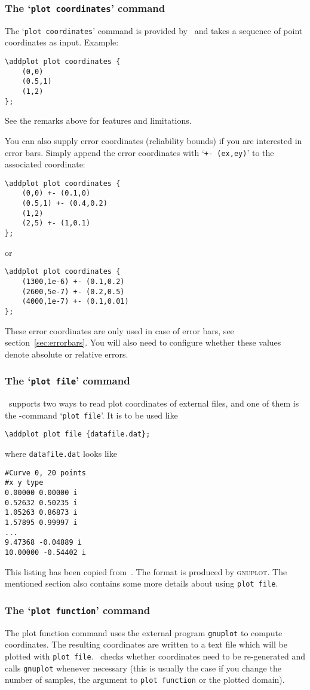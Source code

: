 \subsubsection{The `\texttt{plot coordinates}' command}
The `\texttt{plot coordinates}' command is provided by \Tikz\ and takes a sequence of point coordinates as input. Example:
\begin{lstlisting}
\addplot plot coordinates {
	(0,0)
	(0.5,1)
	(1,2)
};
\end{lstlisting}
See the remarks above for features and limitations.

You can also supply error coordinates (reliability bounds) if you are interested in error bars. Simply append the error coordinates with `\texttt{+- (ex,ey)}' to the associated coordinate:
\begin{lstlisting}
\addplot plot coordinates {
	(0,0) +- (0.1,0)
	(0.5,1) +- (0.4,0.2)
	(1,2)
	(2,5) +- (1,0.1)
};
\end{lstlisting}
or 
\begin{lstlisting}
\addplot plot coordinates {
	(1300,1e-6) +- (0.1,0.2)
	(2600,5e-7) +- (0.2,0.5)
	(4000,1e-7) +- (0.1,0.01)
};
\end{lstlisting}
These error coordinates are only used in case of error bars, see section~\ref{sec:errorbars}. You will also need to configure whether these values denote absolute or relative errors.


\subsubsection{The `\texttt{plot file}' command}
\PGFPlots\ supports two ways to read plot coordinates of external files, and one of them is the \Tikz-command `\texttt{plot file}'. It is to be used like
\begin{lstlisting}
\addplot plot file {datafile.dat};
\end{lstlisting}
where \texttt{datafile.dat} looks like
\begin{lstlisting}
#Curve 0, 20 points
#x y type
0.00000 0.00000 i
0.52632 0.50235 i
1.05263 0.86873 i
1.57895 0.99997 i
...
9.47368 -0.04889 i
10.00000 -0.54402 i
\end{lstlisting}
This listing has been copied from~\cite[section~16.4]{tikz}. The format is produced by \textsc{gnuplot}. The mentioned section also contains some more details about using \texttt{plot file}.

\subsubsection{The `\texttt{plot function}' command}
The plot function command uses the external program \texttt{gnuplot} to compute coordinates. The resulting coordinates are written to a text file which will be plotted with \texttt{plot file}. \PGF\ checks whether coordinates need to be re-generated and calls \texttt{gnuplot} whenever necessary (this is usually the case if you change the number of samples, the argument to \texttt{plot function} or the plotted domain).

